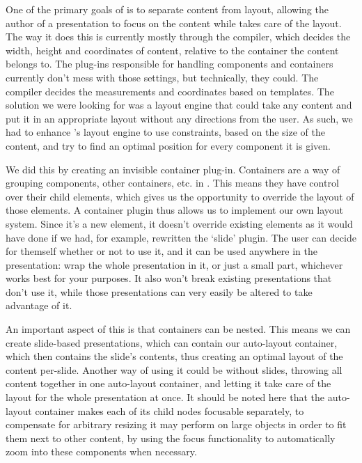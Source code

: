    One of the primary goals of \mxp is to separate content from layout,
   allowing the author of a presentation to focus on the content while \mxp
   takes care of the layout. The way it does this is currently mostly through
   the compiler, which decides the width, height and coordinates of content,
   relative to the container the content belongs to. The plug-ins responsible
   for handling components and containers currently don't mess with those
   settings, but technically, they could. The compiler decides the measurements
   and coordinates based on templates. The solution we were looking for was a
   layout engine that could take any content and put it in an appropriate
   layout without any directions from the user. As such, we had to enhance
   \mxp's layout engine to use constraints, based on the size of the content,
   and try to find an optimal position for every component it is given.

   We did this by creating an invisible container plug-in. Containers are a way
   of grouping components, other containers, etc. in \mxp. This means they have
   control over their child elements, which gives us the opportunity to
   override the layout of those elements. A container plugin thus allows us to
   implement our own layout system. Since it's a new element, it doesn't
   override existing elements as it would have done if we had, for example,
   rewritten the `slide' plugin. The user can decide for themself whether or
   not to use it, and it can be used anywhere in the presentation: wrap the
   whole presentation in it, or just a small part, whichever works best for
   your purposes. It also won't break existing presentations that don't use it,
   while those presentations can very easily be altered to take advantage of
   it.

   An important aspect of this is that containers can be nested. This means we
   can create slide-based presentations, which can contain our auto-layout
   container, which then contains the slide's contents, thus creating an
   optimal layout of the content per-slide. Another way of using it could be
   without slides, throwing all content together in one auto-layout container,
   and letting it take care of the layout for the whole presentation at once.
   It should be noted here that the auto-layout container makes each of its
   child nodes focusable separately, to compensate for arbitrary resizing it
   may perform on large objects in order to fit them next to other content, by
   using the focus functionality to automatically zoom into these components
   when necessary.
  
